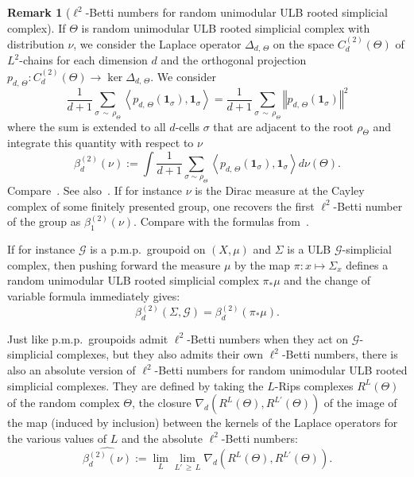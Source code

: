 \documentclass[10pt]{amsart}
\theoremstyle{definition}
\newtheorem{rema}[cdrthm]{Remark}
\newcommand{\cg}{\mathcal{G}}
\newcommand{\indic}{\mathbf{1}}
\newcommand{\pmp}{p.m.p.\ }
\begin{document}
\begin{rema}[$\ell^2$-Betti numbers for random unimodular ULB rooted simplicial complex]\label{rem: random unimodular simplicial complexes}
If $\Theta$ is random unimodular ULB rooted simplicial complex with distribution $\nu$, we consider the Laplace operator $\Delta_{d,\,\Theta}$ on the space $C^{(2)}_d(\Theta)$ of $L^2$-chains for each dimension $d$ and the orthogonal projection $p_{d,\,\Theta}: C^{(2)}_d(\Theta)\to \ker \Delta_{d,\,\Theta}$. We consider
\[
\frac{1}{d+1} \sum_{\sigma\,\sim\,\rho_{\Theta}} \left\langle p_{d,\,\Theta}(\indic_{\sigma}), \indic_{\sigma}\right\rangle=\frac{1}{d+1} \sum_{\sigma\,\sim\,\rho_{\Theta}} \left\Vert p_{d,\,\Theta}(\indic_{\sigma}) \right\Vert^2
\]
where the sum is extended to all $d$-cells $\sigma$ that are adjacent to the root $\rho_\Theta$ and integrate this quantity with respect to $\nu$
\begin{equation}
\beta_d^{(2)}(\nu):= \int \frac{1}{d+1} \sum_{\sigma\sim \rho_{\Theta}} \left\langle p_{d,\,\Theta}(\indic_{\sigma}), \indic_{\sigma}\right\rangle d\nu(\Theta).
\end{equation}
Compare~\cite{Schrodel-L2-Betti-simpl-cplx-2018}. See also~\cite{Elek-10-Betti-test}. If for instance $\nu$ is the Dirac measure at the Cayley complex of some finitely presented group, one recovers the first $\ell^2$-Betti number of the group as $\beta_1^{(2)}(\nu)$. Compare with the formulas from~\cite{Gab05}.



If for instance $\cg$ is a \pmp groupoid on $(X,\mu)$ and $\Sigma$ is a ULB $\cg$-simplicial complex, then pushing forward the measure $\mu$ by the map $\pi:x\mapsto \Sigma_x$ defines a random unimodular ULB rooted simplicial complex $\pi_*\mu$ and the change of variable formula immediately gives:
\[
\beta^{(2)}_d\left(\Sigma, \cg\right)= \beta^{(2)}_d\left(\pi_*\mu\right).
\]

Just like \pmp groupoids admit $\ell^2$-Betti numbers when they act on $\cg$-simplicial complexes, but they also admits their own $\ell^2$-Betti numbers, there is also an absolute version of $\ell^2$-Betti numbers for random unimodular ULB rooted simplicial complexes. They are defined by taking the $L$-Rips complexes $R^L(\Theta)$ of the random complex $\Theta$, the closure $\nabla_d(R^{L}(\Theta),R^{L'}(\Theta))$ of the image of the map (induced by inclusion) between the kernels of the Laplace operators for the various values of $L$ and the absolute $\ell^2$-Betti numbers:
\begin{equation}\label{eq:formula_for_betti_number random complexes}
\widehat{\beta_d^{(2)}(\nu)}:=\lim_{L} \lim_{L'\,\geq\,L} \nabla_d\left(R^{L}(\Theta),R^{L'}(\Theta)\right).
\end{equation}


\end{rema}
\end{document}
